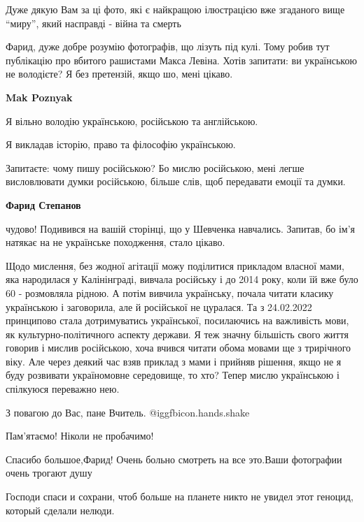 \begin{itemize}
Дуже дякую Вам за ці фото, які є найкращою ілюстрацією вже згаданого вище
\enquote{миру}, який насправді - війна та смерть



Фарид, дуже добре розумію фотографів, що лізуть під кулі. Тому робив тут
публікацію про вбитого рашистами Макса Левіна.  Хотів запитати: ви українською
не володієте? Я без претензій, якщо шо, мені цікаво.

\begin{itemize} %
\textbf{Mak Poznyak}

Я вільно володію українською, російською та англійською.

Я викладав історію, право та філософію українською.

Запитаєте: чому пишу російською? Бо мислю російською, мені легше висловлювати
думки російською, більше слів, щоб передавати емоції та думки.

\textbf{Фарид Степанов} 

чудово! Подивився на вашій сторінці, що у Шевченка навчались. Запитав, бо ім'я
натякає на не українське походження, стало цікаво.

Щодо мислення, без жодної агітації можу поділитися прикладом власної мами, яка
народилася у Калінінграді, вивчала російську і до 2014 року, коли їй вже було
60 - розмовляла рідною. А потім вивчила українську, почала читати класику
українською і заговорила, але й російської не цуралася. Та з 24.02.2022
принципово стала дотримуватись української, посилаючись на важливість мови, як
культурно-політичного аспекту держави. Я теж значну більшість свого життя
говорив і мислив російською, хоча вчився читати обома мовами ще з трирічного
віку. Але через деякий час взяв приклад з мами і прийняв рішення, якщо не я
буду розвивати україномовне середовище, то хто? Тепер мислю українською і
спілкуюся переважно нею.

З повагою до Вас, пане Вчитель.  @igg{fbicon.hands.shake} 

\end{itemize} %

Пам'ятаємо! Ніколи не пробачимо!

Спасибо большое,Фарид!
Очень больно смотреть на все это.Ваши фотографии очень трогают душу

Господи спаси и сохрани, чтоб больше на планете никто не увидел этот геноцид, который сделали нелюди.


\end{itemize}
